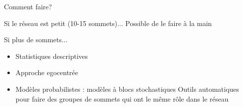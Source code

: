 \documentclass[compress,10pt]{beamer}
\begin{document}
\begin{frame}{Comment faire?}
\begin{block}{Si le réseau est petit (10-15 sommets)...}
Possible de le faire à la main


\end{block}

\begin{block}{Si plus de sommets... }

\begin{itemize}
\item Statistiques descriptives 
\item Approche egocentrée 
\item Modèles probabilistes : modèles à blocs stochastiques
Outils automatiques pour faire des groupes de sommets qui ont le même rôle dans le réseau 
\end{itemize}

\end{block}
\end{frame}


%
%
%  
  
  
\end{document}
